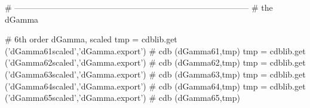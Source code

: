 \documentclass[12pt]{cdblatex}
\begin{document}
\begin{cadabra}
   # ------------------------------------------------------------------------------------
   # the dGamma

   # 6th order dGamma, scaled
   tmp = cdblib.get ('dGamma61scaled','dGamma.export')  # cdb (dGamma61,tmp)
   tmp = cdblib.get ('dGamma62scaled','dGamma.export')  # cdb (dGamma62,tmp)
   tmp = cdblib.get ('dGamma63scaled','dGamma.export')  # cdb (dGamma63,tmp)
   tmp = cdblib.get ('dGamma64scaled','dGamma.export')  # cdb (dGamma64,tmp)
   tmp = cdblib.get ('dGamma65scaled','dGamma.export')  # cdb (dGamma65,tmp)

\end{cadabra}
\end{document}
